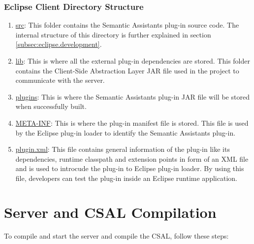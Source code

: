 \subsubsection{Eclipse Client Directory Structure}
\begin{enumerate}
\item \url{src}: This folder contains the Semantic Assistants plug-in source
code. The internal structure of this directory is further explained in section
\ref{subsec:eclipse.development}.
\item \url{lib}: This is where all the external plug-in dependencies are stored.
This folder contains the Client-Side Abstraction Layer JAR file used in the
project to communicate with the server.
\item \url{plugins}: This is where the Semantic Assistants plug-in JAR file will
be stored when successfully built.
\item \url{META-INF}: This is where the plug-in manifest file is stored. This
file is used by the Eclipse plug-in loader to identify the Semantic Assistants
plug-in.
\item \url{plugin.xml}: This file
contains general information of the plug-in like its dependencies, runtime
classpath and extension points in form of an XML file and is used to
introcude the plug-in to Eclipse plug-in loader. By using this file, developers
can test the plug-in inside an Eclipse runtime application.
\end{enumerate}


\section{Server and CSAL Compilation} 
\label{sec:inst-comp}
To compile and start the server and compile the CSAL, follow these
steps:


